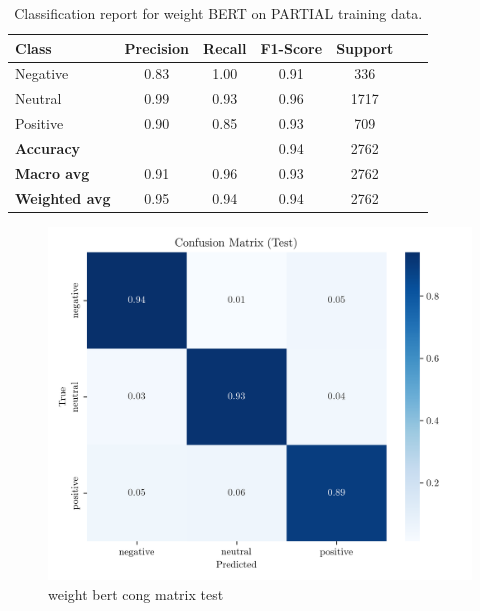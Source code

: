\documentclass[conference]{IEEEtran}
\begin{document}
\begin{table}[H]
\centering
\caption{Classification report for weight BERT on PARTIAL training data.}
\label{cr_weightbert_train}
\begin{tabular}{lcccccc}
\toprule
\textbf{Class} & \textbf{Precision} & \textbf{Recall} & \textbf{F1-Score} & \textbf{Support} \\
\midrule
Negative & 0.83 & 1.00 & 0.91 & 336 \\
Neutral & 0.99 & 0.93 & 0.96 & 1717 \\
Positive & 0.90 & 0.85 & 0.93 & 709 \\
\midrule
\textbf{Accuracy} &  &  & 0.94 & 2762 \\
\textbf{Macro avg} & 0.91 & 0.96 & 0.93 & 2762 \\
\textbf{Weighted avg} & 0.95 & 0.94 & 0.94 & 2762 \\
\bottomrule
\end{tabular}
\end{table}

\begin{figure}[H]
    \centering
    \includegraphics[width=1\linewidth]{assets/weighted_bert_confusion_matrix_Test.png}
    \caption{weight bert cong matrix test}
    \label{fig:weighted_bert_confusion_matrix_Test}
\end{figure}
\end{document}

